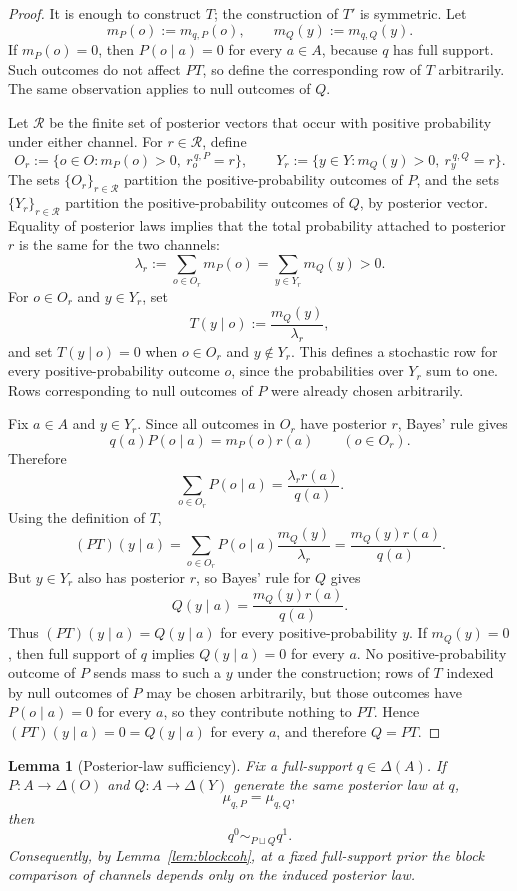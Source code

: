 \documentclass[11pt,a4paper]{article}
\newtheorem{lemma}[theorem]{Lemma}
\theoremstyle{definition}
\newcommand{\1}{\mathbf 1}
\begin{document}
\begin{proof}
It is enough to construct $T$; the construction of $T'$ is symmetric.  Let
\[
m_P(o):=m_{q,P}(o),\qquad m_Q(y):=m_{q,Q}(y).
\]
If $m_P(o)=0$, then $P(o\mid a)=0$ for every $a\in A$, because $q$ has full support.  Such outcomes do not affect
$PT$, so define the corresponding row of $T$ arbitrarily.  The same observation applies to null outcomes of $Q$.

Let $\mathcal R$ be the finite set of posterior vectors that occur with positive probability under either channel.  For
$r\in\mathcal R$, define
\[
O_r:=\{o\in O:m_P(o)>0,\ r_o^{\,q,P}=r\},
\qquad
Y_r:=\{y\in Y:m_Q(y)>0,\ r_y^{\,q,Q}=r\}.
\]
The sets $\{O_r\}_{r\in\mathcal R}$ partition the positive-probability outcomes of $P$, and the sets
$\{Y_r\}_{r\in\mathcal R}$ partition the positive-probability outcomes of $Q$, by posterior vector.
Equality of posterior laws implies that the total probability attached to posterior $r$ is the same for the two
channels:
\[
\lambda_r:=\sum_{o\in O_r}m_P(o)=\sum_{y\in Y_r}m_Q(y)>0.
\]
For $o\in O_r$ and $y\in Y_r$, set
\[
T(y\mid o):=\frac{m_Q(y)}{\lambda_r},
\]
and set $T(y\mid o)=0$ when $o\in O_r$ and $y\notin Y_r$.  This defines a stochastic row for every positive-probability
outcome $o$, since the probabilities over $Y_r$ sum to one.  Rows corresponding to null outcomes of $P$ were already
chosen arbitrarily.

Fix $a\in A$ and $y\in Y_r$.  Since all outcomes in $O_r$ have posterior $r$, Bayes' rule gives
\[
q(a)P(o\mid a)=m_P(o)r(a)
\qquad(o\in O_r).
\]
Therefore
\[
\sum_{o\in O_r}P(o\mid a)
=
\frac{\lambda_r r(a)}{q(a)}.
\]
Using the definition of $T$,
\[
(PT)(y\mid a)
=
\sum_{o\in O_r}P(o\mid a)\frac{m_Q(y)}{\lambda_r}
=
\frac{m_Q(y)r(a)}{q(a)}.
\]
But $y\in Y_r$ also has posterior $r$, so Bayes' rule for $Q$ gives
\[
Q(y\mid a)=\frac{m_Q(y)r(a)}{q(a)}.
\]
Thus $(PT)(y\mid a)=Q(y\mid a)$ for every positive-probability $y$.  If $m_Q(y)=0$, then full support of $q$ implies
$Q(y\mid a)=0$ for every $a$.  No positive-probability outcome of $P$ sends mass to such a $y$ under the construction;
rows of $T$ indexed by null outcomes of $P$ may be chosen arbitrarily, but those outcomes have $P(o\mid a)=0$ for every
$a$, so they contribute nothing to $PT$.  Hence $(PT)(y\mid a)=0=Q(y\mid a)$ for every $a$, and therefore $Q=PT$.
\end{proof}

\begin{lemma}[Posterior-law sufficiency]\label{lem:plsuff}
Fix a full-support $q\in\Delta(A)$.  If $P:A\to\Delta(O)$ and $Q:A\to\Delta(Y)$ generate the same posterior law at $q$,
\[
\mu_{q,P}=\mu_{q,Q},
\]
then
\[
q^0\sim_{P\sqcup Q}q^1.
\]
Consequently, by Lemma~\ref{lem:blockcoh}, at a fixed full-support prior the block comparison of channels depends only
on the induced posterior law.
\end{lemma}
\end{document}
